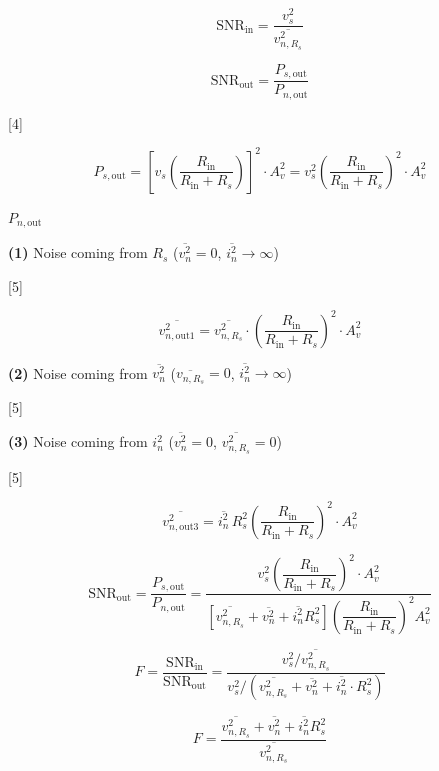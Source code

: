 \documentclass[11pt,a4paper]{article}
\begin{document}
\[ \mathrm{SNR}_{\mathrm{in}} = \frac{v_s^2}{\overline{v_{n,R_s}^2}} \]

\[ \mathrm{SNR}_{\mathrm{out}} = \frac{P_{s,\mathrm{out}}}{P_{n,\mathrm{out}}} \]

[4]

\[ P_{s,\mathrm{out}} = \left[ v_s \left(\frac{R_{\mathrm{in}}}{R_{\mathrm{in}}+R_s}\right) \right]^2 \cdot A_v^2 = v_s^2 \left(\frac{R_{\mathrm{in}}}{R_{\mathrm{in}}+R_s}\right)^2 \cdot A_v^2 \]

$P_{n,\mathrm{out}}$

\textbf{(1)} Noise coming from $R_s$ \quad ($\overline{v_n^2}=0$, $\overline{i_n^2}\to\infty$)

[5]

\[ \overline{v_{n,\mathrm{out}1}^2} = \overline{v_{n,R_s}^2}\cdot\left(\frac{R_{\mathrm{in}}}{R_{\mathrm{in}}+R_s}\right)^2\cdot A_v^2 \]

\textbf{(2)} Noise coming from $\overline{v_n^2}$ \quad ($\overline{v_{n,R_s}}=0$, $\overline{i_n^2}\to\infty$)

[5]

\textbf{(3)} Noise coming from $i_n^2$ \quad ($\overline{v_n^2}=0$, $\overline{v_{n,R_s}^2}=0$)

[5]

\[ \overline{v_{n,\mathrm{out}3}^2} = \overline{i_n^2}\,R_s^2\left(\frac{R_{\mathrm{in}}}{R_{\mathrm{in}}+R_s}\right)^2\cdot A_v^2 \]

\[ \mathrm{SNR}_{\mathrm{out}} = \frac{P_{s,\mathrm{out}}}{P_{n,\mathrm{out}}} = \frac{v_s^2\left(\dfrac{R_{\mathrm{in}}}{R_{\mathrm{in}}+R_s}\right)^2\cdot A_v^2}{\left[\overline{v_{n,R_s}^2}+\overline{v_n^2}+\overline{i_n^2}R_s^2\right]\left(\dfrac{R_{\mathrm{in}}}{R_{\mathrm{in}}+R_s}\right)^2 A_v^2} \]


\[ F = \frac{\mathrm{SNR}_{\mathrm{in}}}{\mathrm{SNR}_{\mathrm{out}}} = \frac{v_s^2\big/\overline{v_{n,R_s}^2}}{v_s^2\big/\left(\overline{v_{n,R_s}^2}+\overline{v_n^2}+\overline{i_n^2}\cdot R_s^2\right)} \]

\[ F = \frac{\overline{v_{n,R_s}^2}+\overline{v_n^2}+\overline{i_n^2}R_s^2}{\overline{v_{n,R_s}^2}} \]

\end{document}
